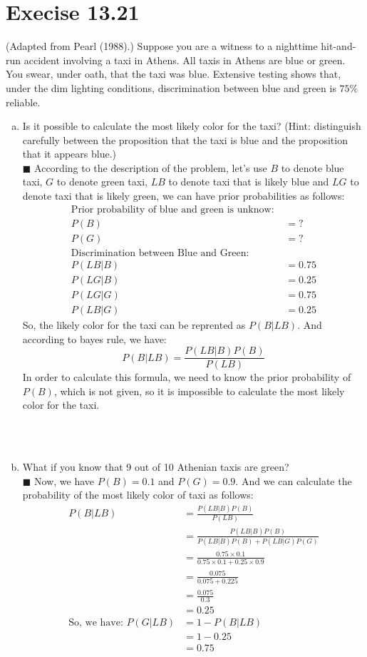 \documentclass{article}
\newcommand{\solution}[1]{~\\ $\blacksquare$ \sffamily\upshape\selectfont #1
\normalfont ~\\~ }
\begin{document}
\section{Execise 13.21}
(Adapted from Pearl (1988).) Suppose you are a witness to a nighttime
hit-and-run accident involving a taxi in Athens. All taxis in Athens
are blue or green. You swear, under oath, that the taxi was
blue. Extensive testing shows that, under the dim lighting conditions,
discrimination between blue and green is $75\%$ reliable.
\begin{enumerate}[a.]
\item Is it possible to calculate the most likely color for the taxi?
  (Hint: distinguish carefully between the proposition that the taxi is
  blue and the proposition that it appears blue.)
  \solution{According to the description of the problem, let's use $B$
    to denote blue taxi, $G$ to denote green taxi, $LB$ to denote taxi
    that is likely blue and $LG$ to denote taxi that is likely green,
    we can have prior probabilities as follows: \\ 
    \begin{align*}
      \mbox{Prior probability of blue and green is unknow: } \\
      P(B) & = ? \\
      P(G) & = ? \\
      \mbox{Discrimination between Blue and Green: } \\
      P(LB|B) & = 0.75 \\ 
      P(LG|B) & = 0.25 \\
      P(LG|G) & = 0.75 \\
      P(LB|G) & = 0.25
    \end{align*}
    So, the likely color for the taxi can be reprented as $P(B|LB)$. 
    And according to bayes rule, we have: \\ 
    \[ P(B|LB)=\frac{P(LB|B)P(B)}{P(LB)} \]
    In order to calculate this formula, we need to know the prior
    probability of $P(B)$, which is not given, so it is impossible to
    calculate the most likely color for the taxi. 
  }
\item What if you know that 9 out of 10 Athenian taxis are green?
  \solution{Now, we have $P(B)=0.1$ and $P(G)=0.9$. And we can
    calculate the probability of the most likely color of taxi as
    follows: \\ 
    \begin{align*}
      P(B|LB) & = \frac{P(LB|B)P(B)}{P(LB)} \\
      & = \frac{P(LB|B)P(B)}{P(LB|B)P(B) + P(LB|G)P(G)} \\
      & = \frac{0.75\times 0.1}{0.75\times 0.1 + 0.25\times 0.9} \\
      & = \frac{0.075}{0.075+0.225} \\ 
      & = \frac{0.075}{0.3} \\
      & = 0.25 \\ 
      \mbox{So, we have: } P(G|LB) & = 1-P(B|LB) \\
      & = 1-0.25 \\
      & = 0.75
    \end{align*}
  }
\end{enumerate}
\end{document}
